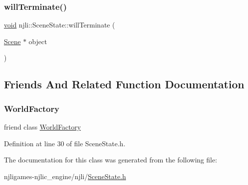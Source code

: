 \mbox{\label{classnjli_1_1_scene_state_af24fbd52046a96068f4c95a7c8ba199a}} 
\subsubsection{\texorpdfstring{will\+Terminate()}{willTerminate()}}
{\footnotesize\ttfamily \mbox{\hyperlink{_thread_8h_af1e856da2e658414cb2456cb6f7ebc66}{void}} njli\+::\+Scene\+State\+::will\+Terminate (\begin{DoxyParamCaption}\item[{\mbox{\hyperlink{classnjli_1_1_scene}{Scene}} $\ast$}]{object }\end{DoxyParamCaption})}



\subsection{Friends And Related Function Documentation}
\mbox{\label{classnjli_1_1_scene_state_acb96ebb09abe8f2a37a915a842babfac}} 
\subsubsection{\texorpdfstring{World\+Factory}{WorldFactory}}
{\footnotesize\ttfamily friend class \mbox{\hyperlink{classnjli_1_1_world_factory}{World\+Factory}}\hspace{0.3cm}{\ttfamily [friend]}}



Definition at line 30 of file Scene\+State.\+h.



The documentation for this class was generated from the following file\+:\begin{DoxyCompactItemize}
\item 
njligames-\/njlic\+\_\+engine/njli/\mbox{\hyperlink{_scene_state_8h}{Scene\+State.\+h}}\end{DoxyCompactItemize}
